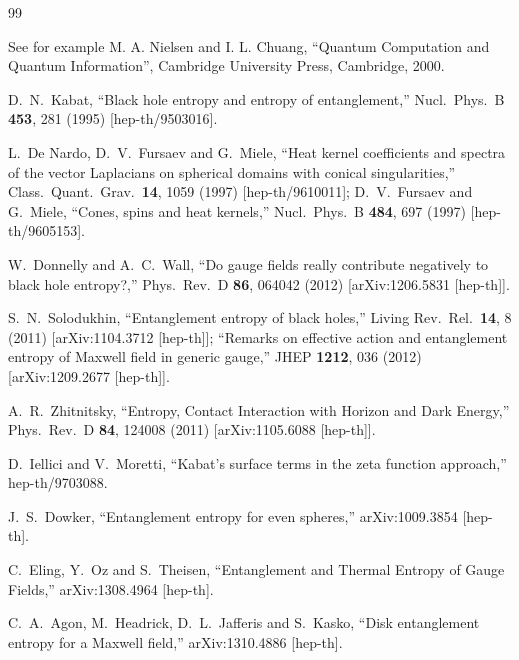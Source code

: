 \documentclass[12pt,a4paper]{article}
\begin{document}
\begin{thebibliography}{99}

See for example M. A. Nielsen and I. L. Chuang, ``Quantum Computation and Quantum Information'', Cambridge University Press, Cambridge, 2000.

 D.~N.~Kabat,
  ``Black hole entropy and entropy of entanglement,''
  Nucl.\ Phys.\ B {\bf 453}, 281 (1995)
  [hep-th/9503016].

  L.~De Nardo, D.~V.~Fursaev and G.~Miele,
  ``Heat kernel coefficients and spectra of the vector Laplacians on spherical domains with conical singularities,''
  Class.\ Quant.\ Grav.\  {\bf 14}, 1059 (1997)
  [hep-th/9610011];
  D.~V.~Fursaev and G.~Miele,
  ``Cones, spins and heat kernels,''
  Nucl.\ Phys.\ B {\bf 484}, 697 (1997)
  [hep-th/9605153].
  
 
  W.~Donnelly and A.~C.~Wall,
  ``Do gauge fields really contribute negatively to black hole entropy?,''
  Phys.\ Rev.\ D {\bf 86}, 064042 (2012)
  [arXiv:1206.5831 [hep-th]].
  
 S.~N.~Solodukhin, 
  ``Entanglement entropy of black holes,''
  Living Rev.\ Rel.\  {\bf 14}, 8 (2011)
  [arXiv:1104.3712 [hep-th]]; 
  ``Remarks on effective action and entanglement entropy of Maxwell field in generic gauge,''
  JHEP {\bf 1212}, 036 (2012)
  [arXiv:1209.2677 [hep-th]].
 
  A.~R.~Zhitnitsky,
  ``Entropy, Contact Interaction with Horizon and Dark Energy,''
  Phys.\ Rev.\ D {\bf 84}, 124008 (2011)
  [arXiv:1105.6088 [hep-th]].

  D.~Iellici and V.~Moretti,
  ``Kabat's surface terms in the zeta function approach,''
  hep-th/9703088.

  
 J.~S.~Dowker,
  ``Entanglement entropy for even spheres,''
  arXiv:1009.3854 [hep-th].

 C.~Eling, Y.~Oz and S.~Theisen,
  ``Entanglement and Thermal Entropy of Gauge Fields,''
  arXiv:1308.4964 [hep-th].
  
C.~A.~Agon, M.~Headrick, D.~L.~Jafferis and S.~Kasko,
  ``Disk entanglement entropy for a Maxwell field,''
  arXiv:1310.4886 [hep-th].


\end{thebibliography}
\end{document}
